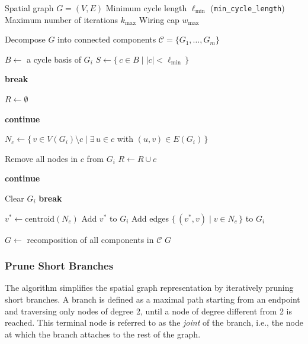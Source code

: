 \documentclass[english,12pt,a4paper]{article}
\begin{document}
	\begin{algorithm}[H]
		\caption{Prune Short Cycles}
		\begin{algorithmic}[1]
			\Require Spatial graph $G=(V,E)$
			\Require Minimum cycle length $\ell_{\min}$ (\texttt{min\_cycle\_length})
			\Require Maximum number of iterations $k_{\max}$
			\Require Wiring cap $w_{\max}$
			
			\Statex
			
			\State Decompose $G$ into connected components $\mathcal{C} = \{G_1,\dots,G_m\}$
			
			\State $B \gets$ a cycle basis of $G_i$
			\State $S \gets \{\, c \in B \mid |c| < \ell_{\min} \,\}$ 
			
			\State \textbf{break}
			\EndIf
			
			\State $R \gets \emptyset$ 
			
			\State \textbf{continue} 
			\EndIf
			
			\State $N_c \gets \{\, v \in V(G_i)\setminus c \mid \exists\, u \in c$ with $(u,v)\in E(G_i) \,\}$
			
			\State Remove all nodes in $c$ from $G_i$
			\State $R \gets R \cup c$
			
			\State \textbf{continue} 
			\EndIf
			
			\State Clear $G_i$ 
			\State \textbf{break}
			\EndIf
			
			\State $v^* \gets \mathrm{centroid}(N_c)$
			\State Add $v^*$ to $G_i$
			\State Add edges $\{\, (v^*,v) \mid v \in N_c \,\}$ to $G_i$
			\EndFor
			\EndFor
			\EndFor
			
			\State $G \gets$ recomposition of all components in $\mathcal{C}$
			\State \Return $G$
		\end{algorithmic}
	\end{algorithm}
	
	\subsubsection{Prune Short Branches}
	
	The algorithm simplifies the spatial graph representation by iteratively pruning short branches. A branch is defined as a maximal path starting from an endpoint and traversing only nodes of degree 2, until a node of degree different from 2 is reached. This terminal node is referred to as the \textit{joint} of the branch, i.e., the node at which the branch attaches to the rest of the graph.
	
\end{document}
